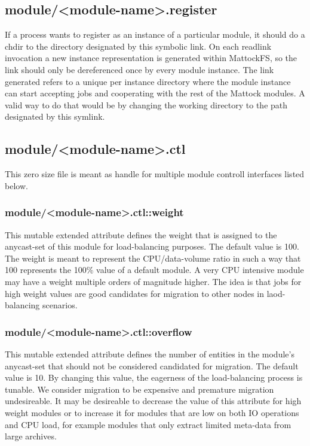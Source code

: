 \subsection{module/<module-name>.register}
If a process wants to register as an instance of a particular module, it should do a chdir to the directory designated by this symbolic link. On each readlink invocation a new instance representation is generated within MattockFS, so the link should only be dereferenced once by every module instance. The link generated refers to a unique per instance directory where the module instance can start accepting jobs and cooperating with the rest of the Mattock modules. A valid way to do that would be by changing the working directory to the path designated by this symlink.
\subsection{module/<module-name>.ctl}
This zero size file is meant as handle for multiple module controll interfaces listed below.
\subsubsection{module/<module-name>.ctl::weight}
This mutable extended attribute defines the weight that is assigned to the anycast-set of this module for load-balancing purposes. The default value is 100. The weight is meant to represent the CPU/data-volume ratio in such a way that 100 represents the 100\% value of a default module. A very CPU intensive module may have a weight multiple orders of magnitude higher. The idea is that jobs for high weight values are good candidates for migration to other nodes in laod-balancing scenarios.
\subsubsection{module/<module-name>.ctl::overflow}
This mutable extended attribute defines the number of entities in the module's anycast-set that should not be considered candidated for migration. The default value is 10. By changing this value, the eagerness of the load-balancing process is tunable. We consider migration to be expensive and premature migration undesireable. It may be desireable to decrease the value of this attribute for high weight modules or to increase it for modules that are low on both IO operations and CPU load, for example modules that only extract limited meta-data from large archives.
